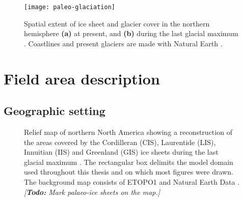 \documentclass{article}
\newcommand{\todo}[1]{\emph{[\textbf{Todo:} #1]}}
\newcommand{\chem}[1]{\ensuremath{\mathrm{#1}}}
\begin{document}
\begin{figure}
  \centering
  \texttt{[image: paleo-glaciation]}
  \caption{Spatial extent of ice sheet and glacier cover in the northern
           hemisphere \textbf{(a)} at present, and \textbf{(b)} during the last
           glacial maximum \citep{Ehlers.Gibbard.2007}. Coastlines and present
           glaciers are made with Natural Earth \citep{Patterson.Kelso.2014}.}
  \label{fig:paleo-glaciation}
\end{figure}

\section{Field area description}

\subsection{Geographic setting}

\begin{figure}
  \centering
  \caption{Relief map of northern North America showing a reconstruction of the
           areas covered by the Cordilleran (CIS), Laurentide (LIS), Innuitian
           (IIS) and Greenland (GIS) ice sheets during the last glacial maximum
           \citep[21.4 to 16.8\,cal\,\chem{^{14}C}\,kyr\,BP][]{Dyke.2004}.
           The rectangular box delimits the model domain used throughout this
           thesis and on which most figures were drawn. The background
           map consists of ETOPO1 \citep{Amante.Eakins.2009} and Natural Earth
           Data \citep{Patterson.Kelso.2014}.
           \todo{Mark palaeo-ice sheets on the map.}}
  \label{fig:locmap}
\end{figure}
\end{document}

